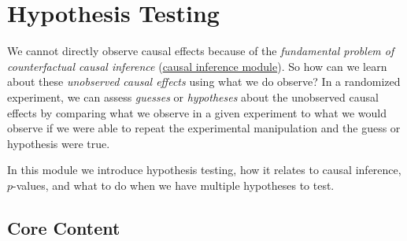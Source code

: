 \documentclass[12pt,]{book}
\begin{document}
\hypertarget{hypothesis-testing}{%
\chapter{Hypothesis Testing}\label{hypothesis-testing}}

We cannot directly observe causal effects because of the \emph{fundamental problem of counterfactual causal inference} (\href{causal-inference.html}{causal inference module}). So how can we learn about these \emph{unobserved causal effects} using what we do observe? In a randomized experiment, we can assess \emph{guesses} or \emph{hypotheses} about the unobserved causal effects by comparing what we observe in a given experiment to what we would observe if we were able to repeat the experimental manipulation and the guess or hypothesis were true.

In this module we introduce hypothesis testing, how it relates to causal inference, \(p\)-values, and what to do when we have multiple hypotheses to test.

\hypertarget{core-content-3}{%
\section{Core Content}\label{core-content-3}}
\end{document}
